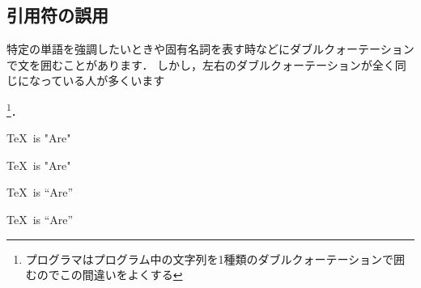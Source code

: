 \documentclass[dvipdfmx,uplatex]{jsarticle}
\begin{document}
\subsection{引用符の誤用}
特定の単語を強調したいときや固有名詞を表す時などにダブルクォーテーションで文を囲むことがあります．
しかし，左右のダブルクォーテーションが全く同じになっている人が多くいます
{\footnote{プログラマはプログラム中の文字列を1種類のダブルクォーテーションで囲むのでこの間違いをよくする}．
\begin{tcolorbox}[title=引用符の誤用]
  \begin{tcolorbox}[title=同じダブルクォーテーションの使用, colframe=wrongcolor]
    \begin{excode}
      \TeX\ is "Are"
    \end{excode}
    \TeX\ is "Are"
  \end{tcolorbox}
  \begin{tcolorbox}[title=開きクォートと，閉じクォートの使用, colframe=correctcolor]
    \begin{excode}
      \TeX\ is ``Are''
    \end{excode}
    \TeX\ is ``Are''
  \end{tcolorbox}
\end{tcolorbox}

}
\end{document}
